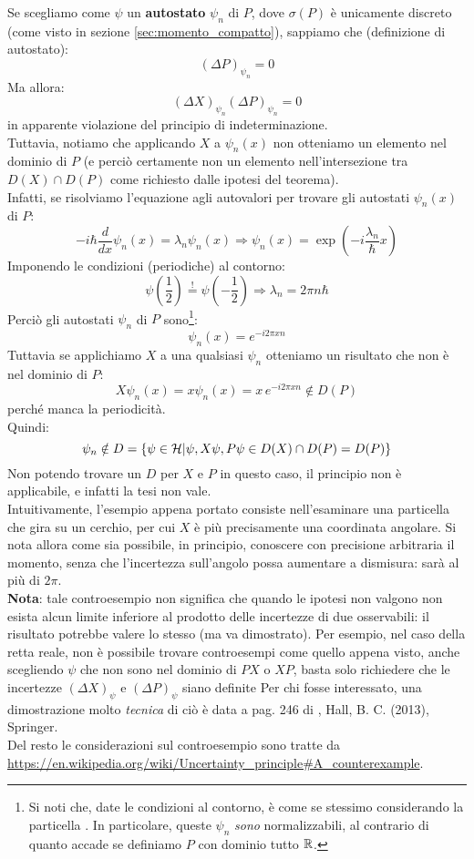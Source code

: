 \documentclass[../../FisicaTeorica.tex]{subfiles}
\begin{document}
\begin{itemize}
Se scegliamo come $\psi$ un \textbf{autostato} $\psi_n$ di $P$, dove $\sigma(P)$ è unicamente discreto (come visto in sezione \ref{sec:momento_compatto}), sappiamo che (definizione di autostato):
\[
(\Delta P)_{\psi_n} = 0
\]
Ma allora:
\[
(\Delta X)_{\psi_n}(\Delta P)_{\psi_n}=0
\]
in apparente violazione del principio di indeterminazione.\\
Tuttavia, notiamo che applicando $X$ a $\psi_n(x)$ non otteniamo un elemento nel dominio di $P$ (e perciò certamente non un elemento nell'intersezione tra $D(X)\cap D(P)$ come richiesto dalle ipotesi del teorema).\\
Infatti, se risolviamo l'equazione agli autovalori per trovare gli autostati $\psi_n(x)$ di $P$:
\[
-i\hbar \frac{d}{dx}\psi_n(x)=\lambda_n \psi_n(x)\Rightarrow \psi_n(x)=\exp\left( -i\frac{\lambda_n}{\hbar}x\right)
\]
Imponendo le condizioni (periodiche) al contorno:
\[
\psi\left(\frac{1}{2}\right)\overset{!}{=}\psi\left(-\frac{1}{2}\right) \Rightarrow \lambda_n = 2\pi n\hbar
\]
Perciò gli autostati $\psi_n$ di $P$ sono\footnote{Si noti che, date le condizioni al contorno, è come se stessimo considerando la particella . In particolare, queste $\psi_n$ \textit{sono} normalizzabili, al contrario di quanto accade se definiamo $P$ con dominio tutto $\mathbb{R}$.}:
\[
\psi_n(x)=e^{-i2\pi x n}
\]
Tuttavia se applichiamo $X$ a una qualsiasi $\psi_n$ otteniamo un risultato che non è nel dominio di $P$:
\[
X\psi_n(x)=x\psi_n(x) = x\,e^{-i2\pi xn} \notin D(P)
\]
perché manca la periodicità.\\
Quindi:
\[
\psi_n \notin D=\{\psi\in \mathcal{H}|\psi, X\psi, P\psi \in D(X)\cap D(P) = D(P)\}
\]
Non potendo trovare un  $D$ per $X$ e $P$ in questo caso, il principio non è applicabile, e infatti la tesi non vale.\\
Intuitivamente, l'esempio appena portato consiste nell'esaminare una particella che gira su un cerchio, per cui $X$ è più precisamente una coordinata angolare. Si nota allora come sia possibile, in principio, conoscere con precisione arbitraria il momento, senza che l'incertezza sull'angolo possa aumentare a dismisura: sarà al più di $2\pi$.\\
\textbf{Nota}: tale controesempio non significa che quando le ipotesi non valgono non esista alcun limite inferiore al prodotto delle incertezze di due osservabili: il risultato potrebbe valere lo stesso (ma va dimostrato). Per esempio, nel caso della retta reale, non è possibile trovare controesempi come quello appena visto, anche scegliendo $\psi$ che non sono nel dominio di $PX$ o $XP$, basta solo richiedere che le incertezze $(\Delta X)_\psi$ e $(\Delta P)_\psi$ siano definite
Per chi fosse interessato, una dimostrazione molto \textit{tecnica} di ciò è data a pag. 246 di , Hall, B. C. (2013), Springer.\\Del resto le considerazioni sul controesempio sono tratte da \url{https://en.wikipedia.org/wiki/Uncertainty_principle#A_counterexample}.
\end{itemize}
\end{document}
